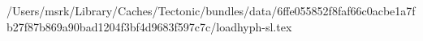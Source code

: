 /Users/msrk/Library/Caches/Tectonic/bundles/data/6ffe055852f8faf66c0acbe1a7fb27f87b869a90bad1204f3bf4d9683f597c7c/loadhyph-sl.tex